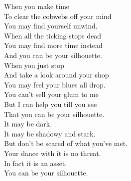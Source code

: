 







When you make time \\
To clear the cobwebs off your mind \\
You may find yourself unwind. \\
When all the ticking stops dead \\
You may find more time instead \\
And you can be your silhouette. \\

When you just stop \\
And take a look around your shop \\
You may feel your blues all drop. \\
You can't sell your glum to me \\
But I can help you till you see \\
That you can be your silhouette. \\

It may be dark. \\
It may be shadowy and stark. \\
But don't be scared of what you've met. \\
Your dance with it is no threat. \\
In fact it is an asset. \\
You can be your silhouette. \\




